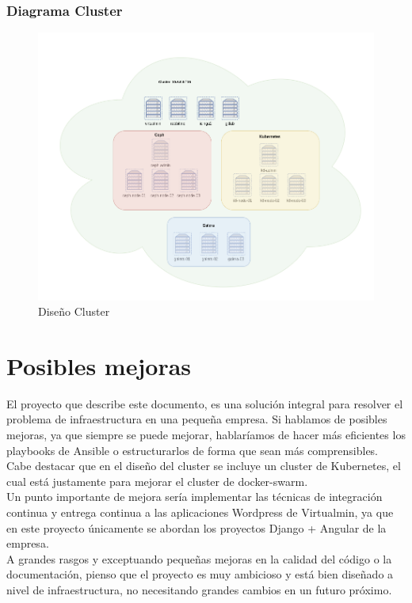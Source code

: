 \begin{text}
		\subsubsection{Diagrama Cluster}
			\begin{figure}[!hbt]
				\centering
				\includegraphics[scale=0.39]{imagenes/Diseno/diagrama_cluster_2.png}
				\caption[Diseño Cluster]{Diseño Cluster} 
				\label{cluster_design}
			\end{figure}
		
	\end{text}
		
\section{Posibles mejoras}
	\begin{text}
		El proyecto que describe este documento, es una solución integral para resolver el problema de infraestructura en una pequeña empresa. Si hablamos de posibles mejoras, ya que siempre se puede mejorar, hablaríamos de hacer más eficientes los playbooks de Ansible o estructurarlos de forma que sean más comprensibles. Cabe destacar que en el diseño del cluster se incluye un cluster de Kubernetes, el cual está justamente para mejorar el cluster de docker-swarm. \\
		Un punto importante de mejora sería implementar las técnicas de integración continua y entrega continua a las aplicaciones Wordpress de Virtualmin, ya que en este proyecto únicamente se abordan los proyectos Django + Angular de la empresa. \\
		A grandes rasgos y exceptuando pequeñas mejoras en la calidad del código o la documentación, pienso que el proyecto es muy ambicioso y está bien diseñado a nivel de infraestructura, no necesitando grandes cambios en un futuro próximo.
	\end{text}